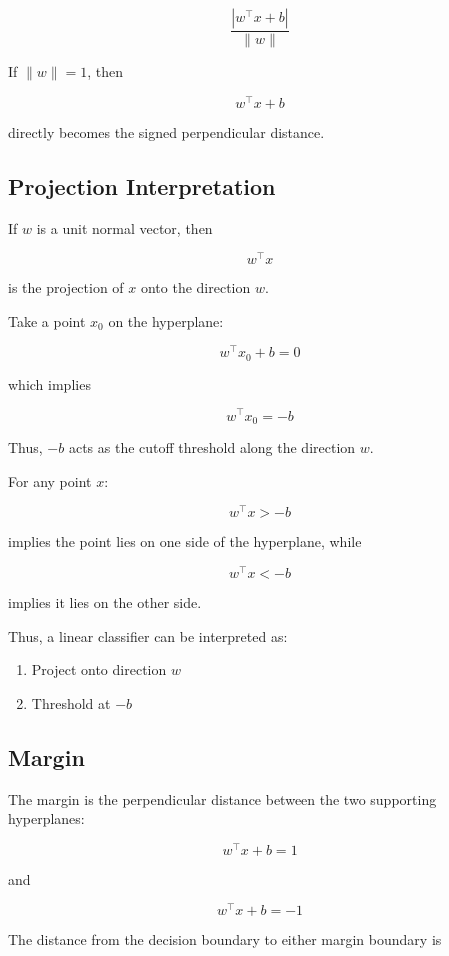 \documentclass[10pt,a4paper]{article}
\begin{document}
		\[
		\frac{|w^\top x+b|}{\|w\|}
		\]
		
		If $\|w\|=1$, then
		
		\[
		w^\top x+b
		\]
		
		directly becomes the signed perpendicular distance.
		
		\subsection{Projection Interpretation}
		
		If $w$ is a unit normal vector, then
		
		\[
		w^\top x
		\]
		
		is the projection of $x$ onto the direction $w$.
		
		Take a point $x_0$ on the hyperplane:
		
		\[
		w^\top x_0+b=0
		\]
		
		which implies
		
		\[
		w^\top x_0=-b
		\]
		
		Thus, $-b$ acts as the cutoff threshold along the direction $w$.
		
		For any point $x$:
		
		\[
		w^\top x > -b
		\]
		
		implies the point lies on one side of the hyperplane, while
		
		\[
		w^\top x < -b
		\]
		
		implies it lies on the other side.
		
		Thus, a linear classifier can be interpreted as:
		
		\begin{enumerate}
		    \item Project onto direction $w$
		    \item Threshold at $-b$
		\end{enumerate}
		
		\subsection{Margin}
		
		The margin is the perpendicular distance between the two supporting hyperplanes:
		
		\[
		w^\top x+b=1
		\]
		
		and
		
		\[
		w^\top x+b=-1
		\]
		
		The distance from the decision boundary to either margin boundary is
		
\end{document}
